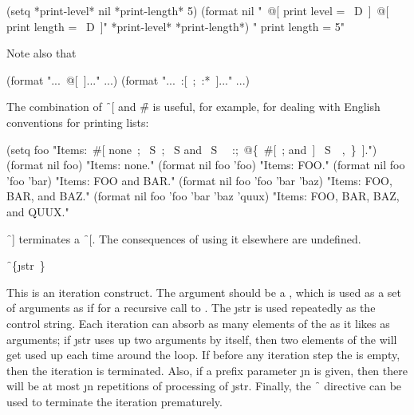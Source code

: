 \code
 (setq *print-level* nil *print-length* 5)
 (format nil
        "~@[ print level = ~D~]~@[ print length = ~D~]"
        *print-level* *print-length*)
\EV  " print length = 5"
\endcode

Note also that

\code
 (format  "...~@[~]..." ...)
\EQ (format  "...~:[~;~:*~]..." ...)
\endcode

The combination of \f{~[} and \f{\#} is useful, for
example, for dealing with English conventions for printing lists:
                         
\code
 (setq foo "Items:~#[ none~; ~S~; ~S and ~S~
           ~:;~@\{~#[~; and~] ~S~\hat\ ,~\}~].")
 (format nil foo) \EV  "Items: none."
 (format nil foo 'foo) \EV  "Items: FOO."
 (format nil foo 'foo 'bar) \EV  "Items: FOO and BAR."
 (format nil foo 'foo 'bar 'baz) \EV  "Items: FOO, BAR, and BAZ."
 (format nil foo 'foo 'bar 'baz 'quux) \EV  "Items: FOO, BAR, BAZ, and QUUX."
\endcode

\endsubsubsection%



\f{~]} terminates a \f{~[}.
The consequences of using it elsewhere are undefined.

\endsubsubsection%


\f{~\{\j{str}~\}}

This is an iteration construct.  The argument should be a ,
which is used as a set of arguments 
as if for a recursive call to .
The  \j{str} is used repeatedly as the control string.
Each iteration can absorb as many elements of the  as it likes
as arguments;
if \j{str} uses up two arguments by itself, then two elements of the
 will get used up each time around the loop.
If before any iteration step the  
is empty, then the iteration is terminated.
Also, if a prefix parameter \j{n} is given, then there will be at most \j{n}
repetitions of processing of \j{str}.  
Finally, the \f{~\hat } directive can be
used to terminate the iteration prematurely.

